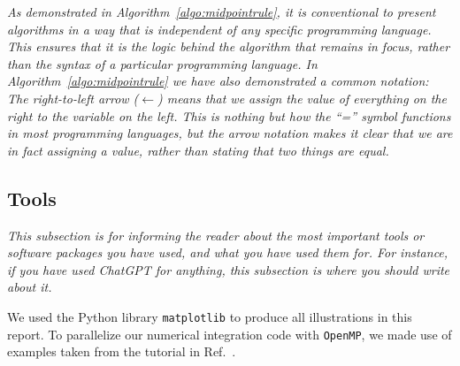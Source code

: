 \documentclass[../main_proj3.tex]{subfiles}
\begin{document}
\textit{As demonstrated in Algorithm~\ref{algo:midpointrule}, it is conventional to present algorithms in a way that is independent of any specific programming language. This ensures that it is the logic behind the algorithm that remains in focus, rather than the syntax of a particular programming language. In Algorithm~\ref{algo:midpointrule} we have also demonstrated a common notation: The right-to-left arrow ($\leftarrow$) means that we assign the value of everything on the right to the variable on the left. This is nothing but how the ``='' symbol functions in most programming languages, but the arrow notation makes it clear that we are in fact assigning a value, rather than stating that two things are equal.}

\subsection*{Tools}
%
\textit{This subsection is for informing the reader about the most important tools or software packages you have used, and what you have used them for. For instance, if you have used ChatGPT for anything, this subsection is where you should write about it.}

We used the Python library \texttt{matplotlib} \cite{Linear_Algebra_and_its_Applications} to produce all illustrations in this report. To parallelize our numerical integration code with \texttt{OpenMP}, we made use of examples taken from the tutorial in Ref.\ \cite{Linear_Algebra_and_its_Applications}.
\end{document}
